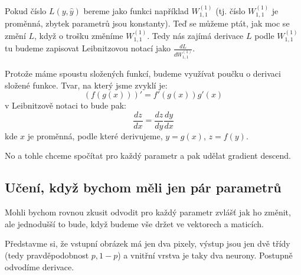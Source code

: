 Pokud číslo $L(y, \hat{y})$ bereme jako funkci například $W^{(1)}_{1, 1}$ (tj. číslo $W^{(1)}_{1, 1}$ je proměnná, zbytek parametrů jsou konstanty).
Teď se můžeme ptát, jak moc se změní $L$, když o trošku změníme $W^{(1)}_{1, 1}$.
Tedy nás zajímá derivace $L$ podle $W^{(1)}_{1, 1}$ tu budeme zapisovat Leibnitzovou notací jako $\frac{dL}{dW^{(1)}_{1, 1}}$.

Protože máme spoustu složených funkcí, budeme využívat poučku o derivaci složené funkce.
Tvar, na který jsme zvyklí je:
$$(f(g(x)))' = f'(g(x))g'(x)$$
v Leibnitzově notaci to bude pak:
$$\frac{dz}{dx} = \frac{dz}{dy}\frac{dy}{dx}$$
kde $x$ je proměnná, podle které derivujeme, $y = g(x)$, $z = f(y)$.

No a tohle chceme spočítat pro každý parametr a pak udělat gradient descend.

\subsection{Učení, když bychom měli jen pár parametrů}

Mohli bychom rovnou zkusit odvodit pro každý parametr zvlášť jak ho změnit, ale jednodušší to bude, když budeme vše držet ve vektorech a maticích.

Představme si, že vstupní obrázek má jen dva pixely, výstup jsou jen dvě třídy (tedy pravděpodobnost $p, 1-p$) a vnitřní vrstva je taky dva neurony.
Postupně odvodíme derivace.

